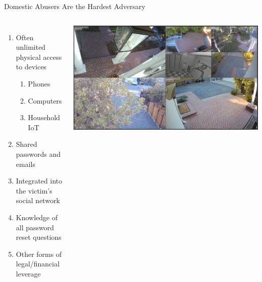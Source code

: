 \documentclass[nobackground,dvipsnames,table,aspectratio=169]{beamer}
\begin{document}
\begin{frame}{Domestic Abusers Are the Hardest Adversary}
    \begin{columns}
            \begin{enumerate}
                \item Often unlimited physical access to devices
                \begin{enumerate}
                    \item Phones
                    \item Computers
                    \item Household IoT
                \end{enumerate}
                \item Shared passwords and emails
                \item Integrated into the victim’s social network
                \item Knowledge of all password reset questions
                \item Other forms of legal/financial leverage
            \end{enumerate}
            \includegraphics[width=\textwidth]{security-cameras}
    \end{columns}
\end{frame}
\end{document}
